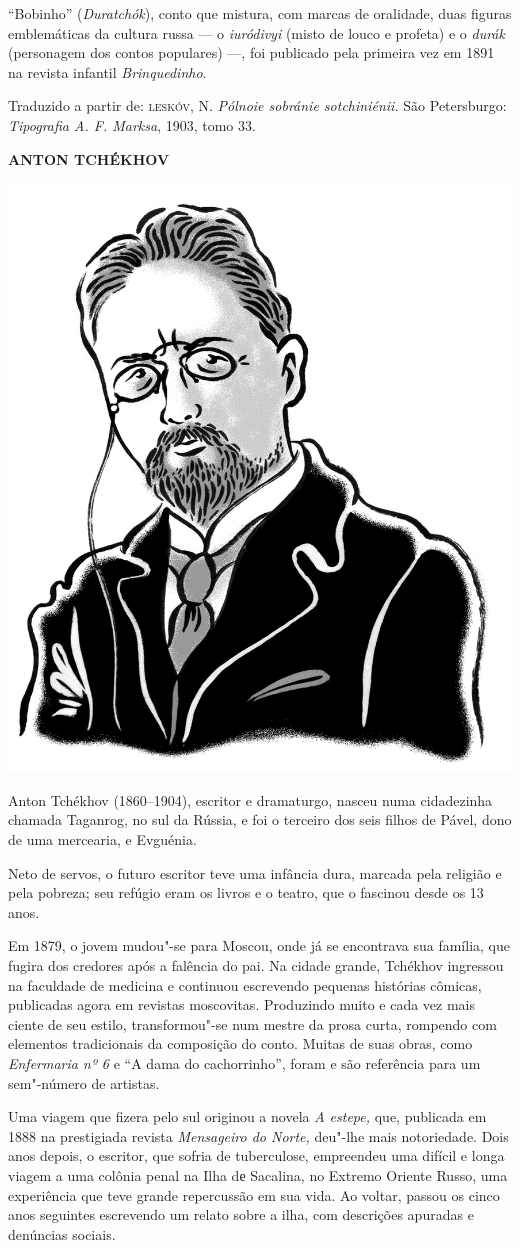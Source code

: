 ``Bobinho'' (\emph{Duratchók}), conto que mistura, com marcas
de oralidade, duas figuras
emblemáticas da cultura russa --- o \emph{iuródivyi} (misto de louco e
profeta) e o \emph{durák} (personagem dos contos populares) ---, foi
publicado pela primeira vez em 1891 na revista infantil
\emph{Brinquedinho}. 

Traduzido a partir de:
\textsc{leskóv}, N. \emph{Pólnoie sobránie sotchiniénii.} São Petersburgo:
\emph{Tipografia A. F. Marksa}, 1903, tomo 33.

\bigskip
\noindent\textbf{ANTON TCHÉKHOV}\medskip

\noindent\includegraphics[width=.8in]{./imgs/autor6.jpg}

\noindent{}Anton Tchékhov (1860--1904), escritor e dramaturgo, nasceu numa
cidadezinha chamada Taganrog, no sul da Rússia, e foi o terceiro dos
seis filhos de Pável, dono de uma mercearia, e Evguénia.

Neto de servos, o futuro escritor teve uma infância dura, marcada pela
religião e pela pobreza; seu refúgio eram os livros e o teatro, que o
fascinou desde os 13 anos.

Em 1879, o jovem mudou"-se para Moscou, onde já se encontrava sua
família, que fugira dos credores após a falência do pai. Na cidade
grande, Tchékhov ingressou na faculdade de medicina e continuou
escrevendo pequenas histórias cômicas, publicadas agora em revistas
moscovitas. Produzindo muito e cada vez mais ciente de seu estilo,
transformou"-se num mestre da prosa curta, rompendo com elementos
tradicionais da composição do conto. Muitas de suas obras, como
\emph{Enfermaria nº 6} e ``A dama do cachorrinho'', foram e são
referência para um sem"-número de artistas.

Uma viagem que fizera pelo sul originou a novela \emph{A estepe,}
que, publicada em 1888 na prestigiada revista \emph{Mensageiro do
Norte,} deu"-lhe mais notoriedade. Dois anos depois, o escritor, que
sofria de tuberculose, empreendeu uma difícil e longa viagem a uma
colônia penal na Ilha dе Sacalina, no Extremo Oriente Russo, uma
experiência que teve grande repercussão em sua vida. Ao voltar, passou
os cinco anos seguintes escrevendo um relato sobre a ilha, com
descrições apuradas e denúncias sociais.

